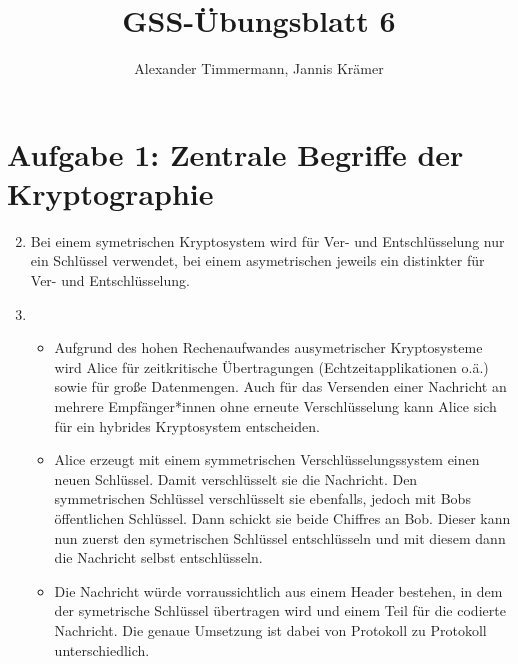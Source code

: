 \documentclass[a4paper,11pt,ngerman]{scrartcl}
\author{Alexander Timmermann, Jannis Krämer}
\title{GSS-Übungsblatt 6}
\date{}
\begin{document}
\maketitle
\thispagestyle{empty}

\doublespace

\section*{Aufgabe 1: Zentrale Begriffe der Kryptographie}
  \begin{enumerate}[\bf 1.]
    \setcounter{enumi}{1}
    \item
      Bei einem symetrischen Kryptosystem wird für Ver- und Entschlüsselung
      nur ein Schlüssel verwendet, bei einem asymetrischen jeweils ein distinkter für
      Ver- und Entschlüsselung.
    \item
      \begin{itemize}
        \item
          Aufgrund des hohen Rechenaufwandes ausymetrischer Kryptosysteme wird
          Alice für zeitkritische Übertragungen (Echtzeitapplikationen o.ä.) sowie
          für große Datenmengen. Auch für das Versenden einer Nachricht an mehrere
          Empfänger*innen ohne erneute Verschlüsselung kann Alice sich für ein
          hybrides Kryptosystem entscheiden.
        \item
          Alice erzeugt mit einem symmetrischen Verschlüsselungssystem einen
          neuen Schlüssel. Damit verschlüsselt sie die Nachricht. Den symmetrischen
          Schlüssel verschlüsselt sie ebenfalls, jedoch mit Bobs öffentlichen Schlüssel.
          Dann schickt sie beide Chiffres an Bob. Dieser kann nun zuerst den symetrischen
          Schlüssel entschlüsseln und mit diesem dann die Nachricht selbst entschlüsseln.
        \item
          Die Nachricht würde vorraussichtlich aus einem Header bestehen, in dem der
          symetrische Schlüssel übertragen wird und einem Teil für die codierte Nachricht.
          Die genaue Umsetzung ist dabei von Protokoll zu Protokoll unterschiedlich.
      \end{itemize}
  \end{enumerate}
\end{document}
